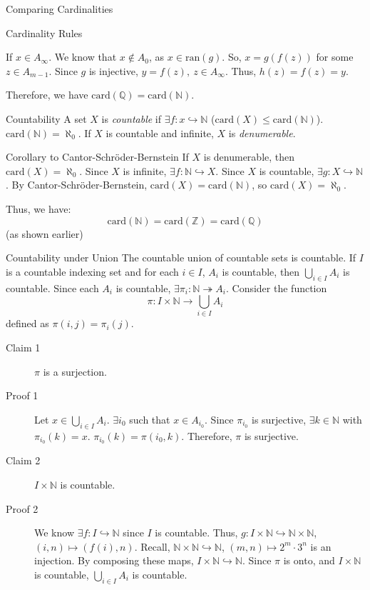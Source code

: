 \documentclass[8pt]{extarticle}
\newcommand{\card}{\text{card}}
\newcommand{\N}{\mathbb{N}}
\newcommand{\Q}{\mathbb{Q}}
\newcommand{\Z}{\mathbb{Z}}
\begin{document}
\begin{problem}{Comparing Cardinalities}
\begin{problem}{Cardinality Rules}
\begin{description}
\begin{description}
              If $x\in A_{\infty}$. We know that $x\notin A_0$, as $x\in \textrm{ran}(g)$. So, $x = g(f(z))$ for some $z\in A_{m-1}$. Since $g$ is injective, $y = f(z),~z\in A_{\infty}$. Thus, $h(z) = f(z) = y$.
          \end{description}
      \end{description}
    \end{problem}
      Therefore, we have $\text{card}(\mathbb{Q}) = \text{card}(\mathbb{N})$.
  \end{problem}
  \begin{problem}{Countability}
    A set $X$ is \textit{countable} if $\exists f: x\hookrightarrow \N$ ($\card(X) \leq\card(\N)$). $\card(\N) = \aleph_0$. If $X$ is countable and infinite, $X$ is \textit{denumerable}.
    \begin{problem}{Corollary to Cantor-Schröder-Bernstein}
      If $X$ is denumerable, then $\card(X) = \aleph_0$.
      \tcblower
      Since $X$ is infinite, $\exists f: \N\hookrightarrow X$. Since $X$ is countable, $\exists g: X\hookrightarrow \N$. By Cantor-Schröder-Bernstein, $\card(X) = \card(\N)$, so $\card(X) = \aleph_0$.
    \end{problem}
    Thus, we have: 
    \[
      \card(\N) = \card(\Z) = \card(\Q)
    \] 
    (as shown earlier)
    \begin{problem}{Countability under Union}
      The countable union of countable sets is countable. If $I$ is a countable indexing set and for each $i\in I$, $A_i$ is countable, then $\bigcup\limits_{i\in I} A_i$ is countable.
      \tcblower
      Since each $A_i$ is countable, $\exists \pi_i: \N \twoheadrightarrow A_i$. Consider the function
      \[
        \pi: I\times\N \rightarrow \bigcup_{i\in I}A_i
      \] 
      defined as $\pi(i,j) = \pi_i(j)$.
      \begin{description}
        \item[Claim 1] $\pi$ is a surjection.
        \item[Proof 1] Let $x\in \bigcup_{i\in I}A_i$. $\exists i_0$ such that $x\in A_{i_0}$. Since $\pi_{i_0}$ is surjective, $\exists k\in \N$ with $\pi_{i_0}(k) = x$. $\pi_{i_0}(k) = \pi(i_0,k)$. Therefore, $\pi$ is surjective.
        \item[Claim 2] $I\times\N$ is countable.
        \item[Proof 2] We know $\exists f: I\hookrightarrow\N$ since $I$ is countable. Thus, $g:I\times\N\hookrightarrow\N\times\N$, $(i,n)\mapsto (f(i),n)$. Recall, $\N\times\N\hookrightarrow \N$, $(m,n)\mapsto 2^m\cdot3^n$ is an injection. By composing these maps, $I\times\N\hookrightarrow\N$. Since $\pi$ is onto, and $I\times\N$ is countable, $\bigcup_{i\in I} A_i$ is countable.
      \end{description}
    \end{problem}
  \end{problem}
\end{document}
